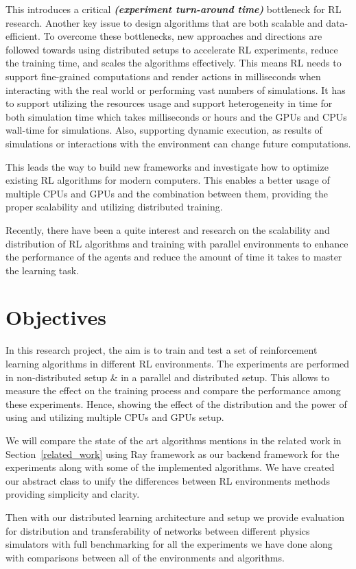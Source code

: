 This introduces a critical \textit{\textbf{(experiment turn-around time)}} bottleneck for RL research. Another key issue to design algorithms that are both scalable and data-efficient. To overcome these bottlenecks, new approaches and directions are followed towards using distributed setups to accelerate RL experiments, reduce the training time, and scales the algorithms effectively. This means RL needs to support fine-grained computations and render actions in milliseconds when interacting with the real world or performing vast numbers of simulations. It has to support utilizing the resources usage and support heterogeneity in time for both simulation time which takes milliseconds or hours and the GPUs and CPUs wall-time for simulations. Also, supporting dynamic execution, as results of simulations or interactions with the environment can change future computations. 

This leads the way to build new frameworks and investigate how to optimize existing RL algorithms for modern computers. This enables a better usage of multiple CPUs and GPUs and the combination between them, providing the proper scalability and utilizing distributed training.

Recently, there have been a quite interest and research on the scalability and distribution of RL algorithms and training with parallel environments to enhance the performance of the agents and reduce the amount of time it takes to master the learning task.

\section{Objectives}
In this research project, the aim is to train and test a set of reinforcement learning algorithms in different RL environments. The experiments are performed in non-distributed setup \& in a parallel and distributed setup. This allows to measure the effect on the training process and compare the performance among these experiments. Hence, showing the effect of the distribution and the power of using and utilizing multiple CPUs and GPUs setup. 

We will compare the state of the art algorithms mentions in the related work in Section~\ref{related_work} using Ray framework as our backend framework for the experiments along with some of the implemented algorithms. We have created our abstract class to unify the differences between RL environments methods providing simplicity and clarity.

Then with our distributed learning architecture and setup we provide evaluation for distribution and transferability of networks between different physics simulators with full benchmarking for all the experiments we have done along with comparisons between all of the environments and algorithms.

